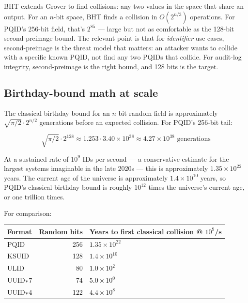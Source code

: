 BHT extends Grover to find collisions: any two values in the space that share an output. For an $n$-bit space, BHT finds a collision in $O(2^{n/3})$ operations. For PQID's 256-bit field, that's $2^{85}$ --- large but not as comfortable as the 128-bit second-preimage bound. The relevant point is that for \emph{identifier} use cases, second-preimage is the threat model that matters: an attacker wants to collide with a specific known PQID, not find any two PQIDs that collide. For audit-log integrity, second-preimage is the right bound, and 128 bits is the target.

\subsection{Birthday-bound math at scale}

The classical birthday bound for an $n$-bit random field is approximately $\sqrt{\pi/2} \cdot 2^{n/2}$ generations before an expected collision. For PQID's 256-bit tail:

\begin{equation}
\sqrt{\pi/2} \cdot 2^{128} \approx 1.253 \cdot 3.40 \times 10^{38} \approx 4.27 \times 10^{38} \text{ generations}
\end{equation}

At a sustained rate of $10^9$ IDs per second --- a conservative estimate for the largest systems imaginable in the late 2020s --- this is approximately $1.35 \times 10^{22}$ years. The current age of the universe is approximately $1.4 \times 10^{10}$ years, so PQID's classical birthday bound is roughly $10^{12}$ times the universe's current age, or one trillion times.

For comparison:

\begin{center}
\renewcommand{\arraystretch}{1.15}
\begin{tabular}{lrl}
\toprule
\textbf{Format} & \textbf{Random bits} & \textbf{Years to first classical collision @ $10^9$/s} \\
\midrule
PQID    & 256 & $1.35 \times 10^{22}$ \\
KSUID   & 128 & $1.4 \times 10^{10}$  \\
ULID    &  80 & $1.0 \times 10^{2}$  \\
UUIDv7  &  74 & $5.0 \times 10^{0}$  \\
UUIDv4  & 122 & $4.4 \times 10^{8}$  \\
\bottomrule
\end{tabular}
\end{center}

